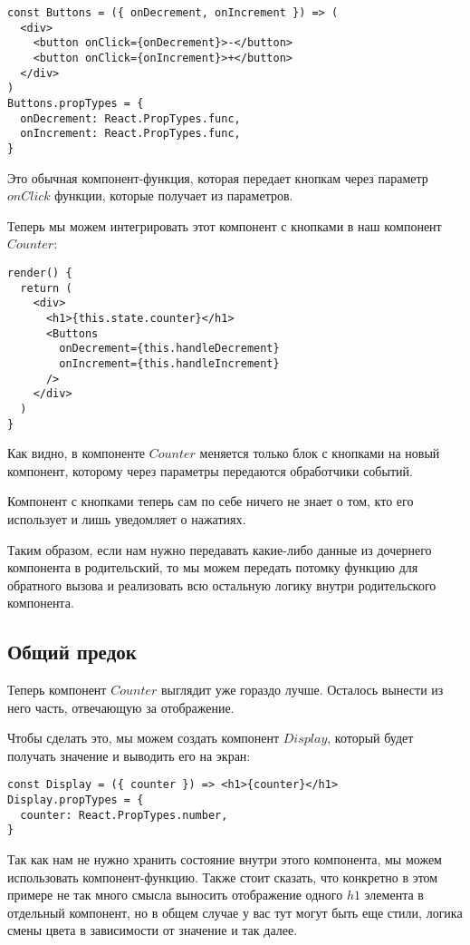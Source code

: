 \begin{lstlisting}	
const Buttons = ({ onDecrement, onIncrement }) => (
  <div>
    <button onClick={onDecrement}>-</button>
    <button onClick={onIncrement}>+</button>
  </div>
)
Buttons.propTypes = {
  onDecrement: React.PropTypes.func,
  onIncrement: React.PropTypes.func,
}
\end{lstlisting}

Это обычная компонент-функция, которая передает кнопкам через параметр $onClick$ функции, которые получает из параметров.

Теперь мы можем интегрировать этот компонент с кнопками в наш компонент $Counter$:

\begin{lstlisting}
render() {
  return (
    <div>
      <h1>{this.state.counter}</h1>
      <Buttons
        onDecrement={this.handleDecrement}
        onIncrement={this.handleIncrement}
      />
    </div>
  )
}
\end{lstlisting}

Как видно, в компоненте $Counter$ меняется только блок с кнопками на новый компонент, которому через параметры передаются обработчики событий.

Компонент с кнопками теперь сам по себе ничего не знает о том, кто его использует и лишь уведомляет о нажатиях.

Таким образом, если нам нужно передавать какие-либо данные из дочернего компонента в родительский, то мы можем передать потомку функцию для обратного вызова и реализовать всю остальную логику внутри родительского компонента.

\subsection{Общий предок}

Теперь компонент $Counter$ выглядит уже гораздо лучше. Осталось вынести из него часть, отвечающую за отображение. 

Чтобы сделать это, мы можем создать компонент $Display$, который будет получать значение и выводить его на экран:

\begin{lstlisting}
const Display = ({ counter }) => <h1>{counter}</h1>
Display.propTypes = {
  counter: React.PropTypes.number,
}
\end{lstlisting}

Так как нам не нужно хранить состояние внутри этого компонента, мы можем использовать компонент-функцию. Также стоит сказать, что конкретно в этом примере не так много смысла выносить отображение одного $h1$ элемента в отдельный компонент, но в общем случае у вас тут могут быть еще стили, логика смены цвета в зависимости от значение и так далее.

